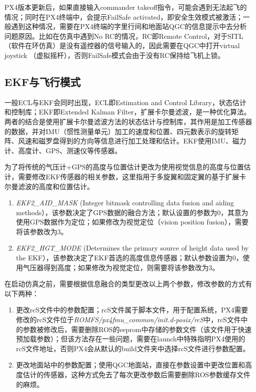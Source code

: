PX4版本更新后，如果直接输入commander takeoff指令，可能会遇到无法起飞的情况；同时在PX4终端中，会提示FailSafe activated，即安全生效模式被激活；一般遇到这种情况，需要在PX4终端的字里行间和地面站QGC的信息提示中去分析问题原因。比如在仿真中遇到No RC的情况，RC即Remote Control，对于SITL（软件在环仿真）是没有遥控器的信号输入的，因此需要在QGC中打开virtual joystick （虚拟摇杆），否则FailSafe模式会由于没有RC保持给飞机上锁。

\subsection{EKF与飞行模式} \label{2.2.2}

一般ECL与EKF会同时出现，ECL即Estimation and Control Library，状态估计和控制库；EKF即Extended Kalman Filter，扩展卡尔曼滤波，是一种优化算法。两者的结合是使用扩展卡尔曼滤波方法的状态估计与控制库，其作用是加工传感器的数据，并对IMU（惯性测量单元）加工的速度和位置、四元数表示的旋转矩阵、风速和磁罗盘得到的方向等信息进行加工处理和估计。EKF使用IMU、磁力计、高度计、GPS、测速仪等传感器。

为了将传统的气压计+GPS的高度与位置估计更改为使用视觉信息的高度与位置估计，需要修改EKF传感器的相关参数，这里指用于多旋翼和固定翼的基于扩展卡尔曼滤波的高度和位置估计。

\begin{enumerate}
	\item 
	\textit{EKF2\_AID\_MASK} (Integer bitmask controlling data fusion and aiding methods），该参数决定了GPS数据的融合方法；默认设置的参数为0，其意为使用GPS数据作为定位；如果修改为视觉定位（vision position fusion），需要将该参数改为3。
	\item 
	\textit{EKF2\_HGT\_MODE} (Determines the primary source of height data used by the EKF），该参数决定了EKF首选的高度信息传感器；默认参数设置为0，使用气压器得到高度；如果修改为视觉定位，则需要将该参数改为3。
\end{enumerate}

在启动仿真之前，需要根据信息融合的类型更改以上两个参数，修改参数的方式有以下两种：
\begin{enumerate}
	\item 更改rcS文件中的参数配置；rcS文件属于脚本文件，用于配置系统，PX4需要修改的rcS文件位于\textit{ROMFS/px4fmu\_common/init.d-posix/rcS}中，rcS文件中的参数被修改后，需要删除ROS的eeprom中存储的参数文件（该文件用于快速预加载参数）；但该方法存在一些问题，需要在launch中特殊指明PX4使用的rcS文件地址，否则PX4会从默认的build文件夹中选择rcS文件进行参数配置。
	\item 
	更改地面站中的参数配置；使用QGC地面站，直接在参数设置中更改位置和高度估计的传感器，这种方式免去了每次更改参数后需要删除ROS参数缓存文件的麻烦。
\end{enumerate}

